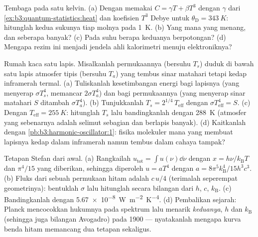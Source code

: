 \begin{exercise}[$\star\star$]\label{exo:b3:photons-phonons:8}
Tembaga pada satu kelvin. (a) Dengan memakai $C = \gamma T + \beta T^3$ dengan
$\gamma$ dari \cref{ex:b3:quantum-statistics:heat} dan koefisien
$T^3$ Debye untuk $\theta_{\text{D}} = \qty{343}{K}$: hitunglah
kedua sukunya tiap molnya pada \qty{1}{K}. (b) Yang mana yang menang, dan
seberapa banyak? (c) Pada suhu berapa keduanya berpotongan? (d) Mengapa
rezim ini menjadi jendela ahli kalorimetri menuju 
elektroniknya?
\end{exercise}

\begin{exercise}[$\star\star$]\label{exo:b3:photons-phonons:9}
Rumah kaca satu lapis. Misalkanlah permukaannya (bersuhu $T_s$) duduk
di bawah satu lapis atmosfer tipis (bersuhu $T_a$) yang tembus
sinar matahari tetapi kedap inframerah termal. (a) Tuliskanlah
kesetimbangan energi bagi lapisnya (yang menyerap $\sigma T_s^4$, memancar
$2\sigma T_a^4$) dan bagi permukaannya (yang menyerap sinar matahari $S$ ditambah
$\sigma T_a^4$). (b) Tunjukkanlah $T_s = 2^{1/4}\,T_{\text{eff}}$ dengan
$\sigma T_{\text{eff}}^4 = S$. (c) Dengan $T_{\text{eff}} =
\qty{255}{K}$: hitunglah $T_s$ lalu bandingkanlah dengan \qty{288}{K}
(atmosfer yang sebenarnya adalah selimut sebagian dan berlapis banyak). (d)
Kaitkanlah dengan \cref{pb:b3:harmonic-oscillator:1}: fisika molekuler
mana yang membuat lapisnya kedap dalam inframerah namun tembus dalam
cahaya tampak?
\end{exercise}

\begin{exercise}[$\star\star\star$]\label{exo:b3:photons-phonons:10}
Tetapan Stefan dari awal. (a) Rangkailah $u_{\text{tot}} =
\int u(\nu)\dd\nu$ dengan $x = h\nu/k_{\text{B}}T$ dan
$\pi^4/15$ yang diberikan, sehingga diperoleh $u = aT^4$ dengan $a =
8\pi^5k_{\text{B}}^4/15h^3c^3$. (b) Fluks dari sebuah permukaan
hitam adalah $c\,u/4$ (terimalah seperempat geometrinya): bentuklah
$\sigma$ lalu hitunglah secara bilangan dari $h$, $c$,
$k_{\text{B}}$. (c) Bandingkanlah dengan \qty{5.67e-8}{W.m^{-2}.K^{-4}}.
(d) Pembalikan sejarah: Planck mencocokkan hukumnya pada spektrum lalu
menarik \emph{keduanya}, $h$ dan $k_{\text{B}}$ (sehingga juga bilangan
Avogadro) pada 1900 --- nyatakanlah mengapa kurva benda hitam memancang
dua tetapan sekaligus.
\end{exercise}

